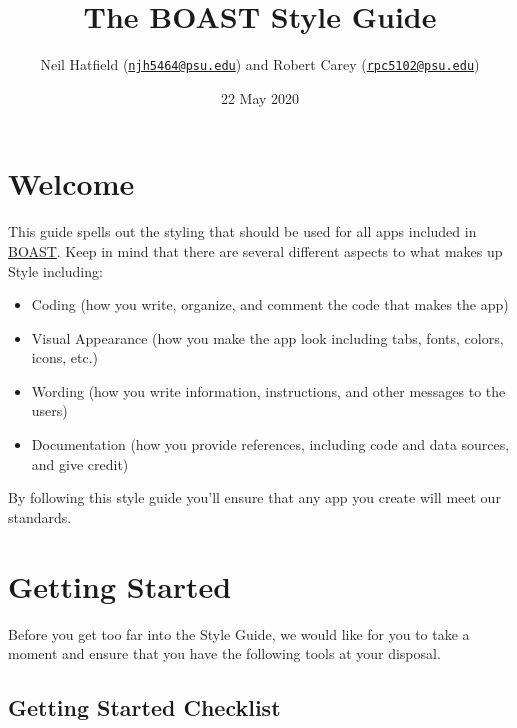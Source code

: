 \documentclass[]{book}
\title{The BOAST Style Guide}
\author{Neil Hatfield (\href{mailto:njh5464@psu.edu}{\nolinkurl{njh5464@psu.edu}}) and Robert Carey (\href{mailto:rpc5102@psu.edu}{\nolinkurl{rpc5102@psu.edu}})}
\date{22 May 2020}
\providecommand{\tightlist}{%
  \setlength{\itemsep}{0pt}\setlength{\parskip}{0pt}}
\begin{document}
\maketitle

{
\setcounter{tocdepth}{1}
\tableofcontents
}
\hypertarget{welcome}{%
\chapter{Welcome}\label{welcome}}

This guide spells out the styling that should be used for all apps included in \href{https://github.com/EducationShinyAppTeam/BOAST}{BOAST}. Keep in mind that there are several different aspects to what makes up Style including:

\begin{itemize}
\tightlist
\item
  Coding (how you write, organize, and comment the code that makes the app)
\item
  Visual Appearance (how you make the app look including tabs, fonts, colors, icons, etc.)
\item
  Wording (how you write information, instructions, and other messages to the users)
\item
  Documentation (how you provide references, including code and data sources, and give credit)
\end{itemize}

By following this style guide you'll ensure that any app you create will
meet our standards.

\hypertarget{getStarted}{%
\chapter{Getting Started}\label{getStarted}}

Before you get too far into the Style Guide, we would like for you to take a moment and ensure that you have the following tools at your disposal.

\hypertarget{checklist}{%
\section{Getting Started Checklist}\label{checklist}}
\end{document}
